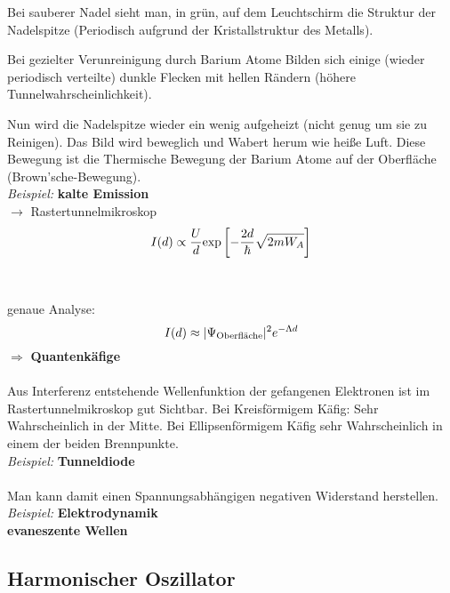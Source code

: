 Bei sauberer Nadel sieht man, in grün, auf dem Leuchtschirm die Struktur der Nadelspitze (Periodisch aufgrund der Kristallstruktur des Metalls).

Bei gezielter Verunreinigung durch Barium Atome Bilden sich einige (wieder periodisch verteilte) dunkle Flecken mit hellen Rändern (höhere Tunnelwahrscheinlichkeit).

Nun wird die Nadelspitze wieder ein wenig aufgeheizt (nicht genug um sie zu Reinigen). Das Bild wird beweglich und Wabert herum wie heiße Luft. Diese Bewegung ist die Thermische Bewegung der Barium Atome auf der Oberfläche (Brown'sche-Bewegung).\\[10pt]
\emph{Beispiel:} \textbf{kalte Emission}\\[5pt]
$ \rightarrow $ Rastertunnelmikroskop
\begin{equation*}
I(d) \propto \frac{U}{d} \textrm{exp} \left[- \frac{2 d}{\hbar} \sqrt{2 m W_A}\right]
\end{equation*}
\\
\\
genaue Analyse:
\begin{equation*}
I(d) \approx | \Psi_{\textrm{Oberfläche}} |^2 e^{- \Lambda d}
\end{equation*}
$ \Rightarrow $ \textbf{Quantenkäfige}\\
\\
Aus Interferenz entstehende Wellenfunktion der gefangenen Elektronen ist im Rastertunnelmikroskop gut Sichtbar. Bei Kreisförmigem Käfig: Sehr Wahrscheinlich in der Mitte. Bei Ellipsenförmigem Käfig sehr Wahrscheinlich in einem der beiden Brennpunkte.\\[10pt]
\emph{Beispiel:} \textbf{Tunneldiode}\\[5pt]
\\
Man kann damit einen Spannungsabhängigen negativen Widerstand herstellen.\\[10pt]
\emph{Beispiel:} \textbf{Elektrodynamik}\\[5pt]
\textbf{evaneszente Wellen} 

\subsection{Harmonischer Oszillator}

